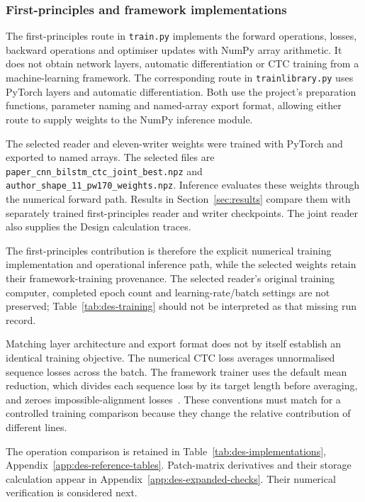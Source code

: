 \subsubsection{First-principles and framework implementations}
\label{sec:des-implementations}
The first-principles route in \texttt{train.py} implements the forward operations, losses, backward operations and optimiser updates with NumPy array arithmetic. It does not obtain network layers, automatic differentiation or CTC training from a machine-learning framework. The corresponding route in \texttt{trainlibrary.py} uses PyTorch layers and automatic differentiation. Both use the project's preparation functions, parameter naming and named-array export format, allowing either route to supply weights to the NumPy inference module.

The selected reader and eleven-writer weights were trained with PyTorch and exported to named arrays. The selected files are \texttt{paper\_cnn\_bilstm\_ctc\_joint\_best.npz} and \texttt{author\_shape\_11\_pw170\_weights.npz}. Inference evaluates these weights through the numerical forward path. Results in Section~\ref{sec:results} compare them with separately trained first-principles reader and writer checkpoints. The joint reader also supplies the Design calculation traces.

The first-principles contribution is therefore the explicit numerical training implementation and operational inference path, while the selected weights retain their framework-training provenance. The selected reader's original training computer, completed epoch count and learning-rate/batch settings are not preserved; Table~\ref{tab:des-training} should not be interpreted as that missing run record.

Matching layer architecture and export format does not by itself establish an identical training objective. The numerical CTC loss averages unnormalised sequence losses across the batch. The framework trainer uses the default mean reduction, which divides each sequence loss by its target length before averaging, and zeroes impossible-alignment losses~\cite{pytorchctc}. These conventions must match for a controlled training comparison because they change the relative contribution of different lines.

The operation comparison is retained in Table~\ref{tab:des-implementations}, Appendix~\ref{app:des-reference-tables}. Patch-matrix derivatives and their storage calculation appear in Appendix~\ref{app:des-expanded-checks}. Their numerical verification is considered next.

